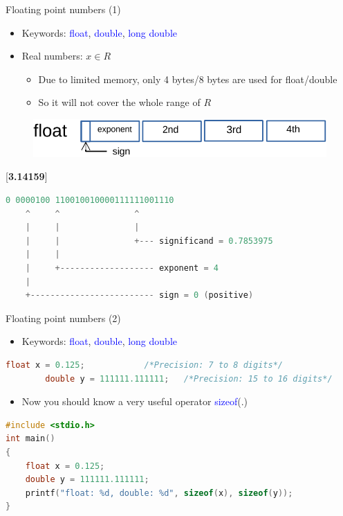 \begin{frame}[fragile]{Floating point numbers (1)}
	\begin{itemize}
		\item {Keywords: \textcolor{blue}{float}, \textcolor{blue}{double}, \textcolor{blue}{long double}}
		\item {Real numbers: $x \in R$}
		\begin{itemize}
			\item {Due to limited memory, only 4 bytes/8 bytes are used for float/double}
			\item {So it will not cover the whole range of $R$}
		\end{itemize}
	\end{itemize}
	\vspace{0.05in}
	\begin{figure}
		\includegraphics[width=0.5\linewidth]{figs/float.pdf}
	\end{figure}
	[\textbf{3.14159}]
	\begin{lstlisting}[language=c, numbers=none, basicstyle=\small, rulecolor=\color{black}]
	    0 0000100 110010010000111111001110
    ^     ^               ^
    |     |               |
    |     |               +--- significand = 0.7853975
    |     |
    |     +------------------- exponent = 4
    |
    +------------------------- sign = 0 (positive)
	\end{lstlisting}
	
\end{frame}

\begin{frame}[fragile]{Floating point numbers (2)}
	\begin{itemize}
		\item Keywords: \textcolor{blue}{float}, \textcolor{blue}{double}, \textcolor{blue}{long double}
	\end{itemize}
	\begin{lstlisting}[numbers=none, frame=none, language=c]
		float x = 0.125;			/*Precision: 7 to 8 digits*/
		double y = 111111.111111;	/*Precision: 15 to 16 digits*/
	\end{lstlisting}
	\vspace{-0.05in}
	\begin{itemize}
		\item {Now you should know a very useful operator \textcolor{blue}{sizeof}(.)}
	\end{itemize}
	\begin{lstlisting}[numbers=none, frame=none, language=c]
#include <stdio.h>
int main()
{
	float x = 0.125;
	double y = 111111.111111;
	printf("float: %d, double: %d", sizeof(x), sizeof(y));
}
	\end{lstlisting}
\end{frame}

